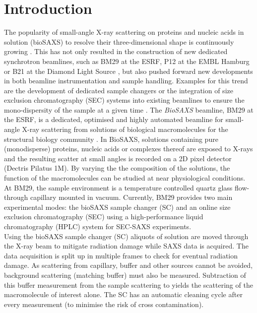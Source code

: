 \documentclass[preprint,pdf]{iucr}              %
\begin{document}
\section{Introduction}
The popularity of small-angle X-ray scattering on proteins and nucleic acids in
solution (bioSAXS) to resolve their three-dimensional shape is continuously
growing \cite{Graewert2013,Hura2009,Reyes2014}.
This has not only resulted in the construction of new dedicated
synchrotron beamlines, such as BM29 at the ESRF, P12 at the EMBL Hamburg or B21
at the Diamond Light Source \cite{BM29paper,P12,B21},
but also pushed forward new developments in both beamline instrumentation and sample handling.
Examples for this trend are the development of dedicated sample changers
\cite{SCpaper,SCchess,SCtainer2009,SCslac} or the integration of size
exclusion chromatography (SEC) systems into existing beamlines to ensure the mono-dispersity of the sample at a given time \cite{SECPaper2012,SECP12,SECSWING,SECbiocat}.
The \textit{BioSAXS} beamline, BM29 at the ESRF, is a dedicated, optimised and highly automated beamline for small-angle X-ray scattering from solutions of biological macromolecules for the structural biology community \cite{BM29paper}. 
In BioSAXS, solutions containing pure (monodisperse) proteins, nucleic acids or complexes thereof are exposed to X-rays and the resulting scatter at small angles is recorded on a 2D pixel detector (Dectris Pilatus 1M).   
By varying the the composition of the solutions, the function of the macromolecules can be studied at near physiological conditions.
At BM29, the sample environment is a temperature controlled quartz glass flow-through capillary mounted in vacuum.
Currently, BM29 provides two main experimental modes: the bioSAXS sample changer (SC) \cite{SCpaper} and an online size exclusion chromatography (SEC) using a high-performance liquid chromatography (HPLC) system  for SEC-SAXS experiments. \\
Using the bioSAXS sample changer (SC) aliquots of solution are moved through the X-ray beam to mitigate radiation damage while SAXS data is acquired. 
The data acquisition is split up in multiple frames to check for eventual radiation damage. 
As scattering from capillary, buffer and other sources cannot be avoided, background scattering (matching buffer) must also be measured. 
Subtraction of this  buffer measurement  from the sample scattering to yields the scattering of the macromolecule of interest alone. 
The SC has an automatic cleaning cycle after every measurement (to minimise the risk of cross contamination). 
\end{document}
